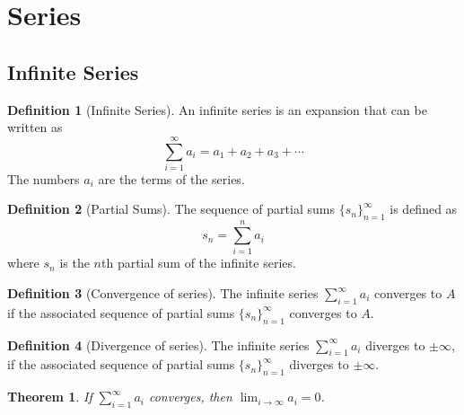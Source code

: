 \documentclass{article}
\theoremstyle{plain}
\newtheorem{theorem}{Theorem}[section]
\numberwithin{theorem}{subsection}
\theoremstyle{definition}
\newtheorem{definition}{Definition}[section]
\numberwithin{definition}{subsection}
\theoremstyle{remark}
\numberwithin{note}{subsection}
\begin{document}
%
\pagebreak
\section{Series}
\subsection{Infinite Series}
\begin{multicols}{2}
\begin{definition}[Infinite Series]
	An infinite series is an expansion that can be written as
	\begin{equation*}
		\sum_{i=1}^\infty a_i = a_1 + a_2 + a_3 + \cdots
	\end{equation*}
	The numbers $a_i$ are the terms of the series.
\end{definition}
\begin{definition}[Partial Sums]
	The sequence of partial sums $\{s_n\}_{n=1}^\infty$ is defined as
	\begin{equation*}
		s_n = \sum_{i=1}^n a_i
	\end{equation*}
	where $s_n$ is the $n$th partial sum of the infinite series.
\end{definition}
\columnbreak
\begin{definition}[Convergence of series]
	The infinite series $\sum_{i=1}^\infty a_i$ converges to $A$ if the associated sequence of partial sums $\{s_n\}_{n=1}^\infty$ converges to $A$.
\end{definition}
\begin{definition}[Divergence of series]
	The infinite series $\sum_{i=1}^\infty a_i$ diverges to $\pm\infty$, if the associated sequence of partial sums $\{s_n\}_{n=1}^\infty$ diverges to $\pm\infty$.
\end{definition}
\begin{theorem}
    If $\sum_{i=1}^{\infty}a_i$ converges, then $\lim_{i\to\infty}a_i=0$.
\end{theorem}
\end{multicols}
%
\end{document}
